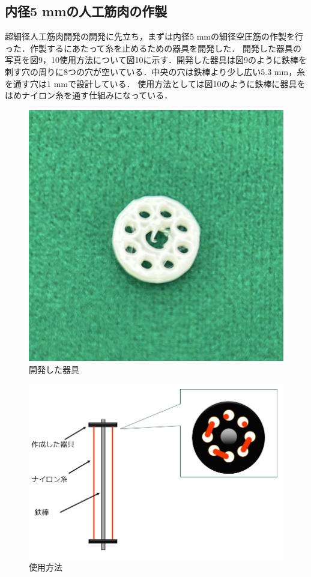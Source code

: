 \subsection{内径5 mmの人工筋肉の作製}
超細径人工筋肉開発の開発に先立ち，まずは内径5 mmの細径空圧筋の作製を行った．作製するにあたって糸を止めるための器具を開発した．
開発した器具の写真を図9，10使用方法について図10に示す．開発した器具は図9のように鉄棒を刺す穴の周りに8つの穴が空いている．中央の穴は鉄棒より少し広い5.3 mm，糸を通す穴は1 mmで設計している．
使用方法としては図10のように鉄棒に器具をはめナイロン糸を通す仕組みになっている．
\begin{figure}[!b]
  \centering  %
  \includegraphics[scale=0.3]{pic/kigu2.jpg}
  \caption{開発した器具}
\end{figure}
\begin{figure}[!b]
  \centering  %
  \includegraphics[scale=0.3]{pic/tukau2.PNG}
  \caption{使用方法}
\end{figure}

